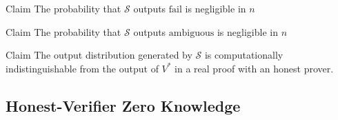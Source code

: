 \documentclass{beamer}
\begin{document}
    \begin{frame}
        \frametitle{}
        \begin{block}{Claim}
            The probability that $\mathcal{S}$ outputs $\mathrm{fail}$ is negligible in $n$
            
        \end{block}
        \begin{block}{Claim}
            The probability that $\mathcal{S}$ outputs $\mathrm{ambiguous}$ is negligible in $n$
        \end{block}

        \begin{block}{Claim}
            The output distribution generated by $\mathcal{S}$ is computationally indistinguishable from the output of $V^{*}$ in a real proof with an honest prover. 
        \end{block}
        
    
    \end{frame}


    \subsection{Honest-Verifier Zero Knowledge}
    \subsectionpage
\end{document}

